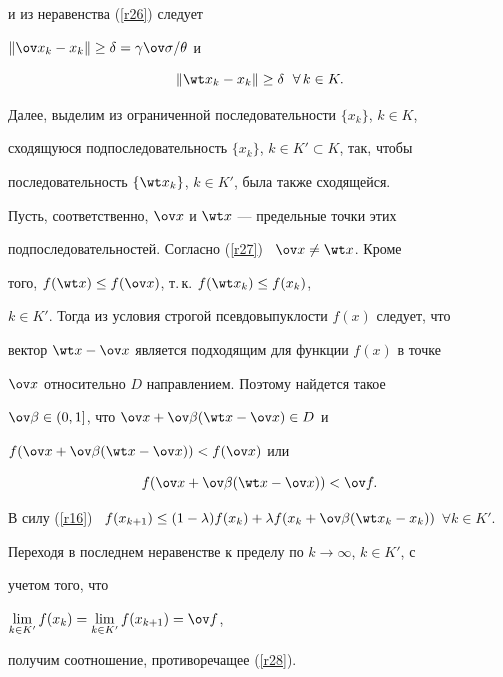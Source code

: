 \begin{pf}
и из неравенства (\ref{r26}) следует


$\|\ov x_k - x_k\| \ge \delta = \gamma \ov \sigma/\theta$ и




\begin{equation} \label{r27}


\|\wt x_k - x_k\| \ge \delta \ \; \forall \, k\in K.


\end{equation}


%


Далее, выделим из ограниченной последовательности $\{x_k\}$, $k\in K$,


сходящуюся подпоследовательность $\{x_k\}$, $k\in K'\subset K$, так, чтобы


последовательность $\{\wt x_k\}$, $k\in K'$, была также сходящейся.


Пусть, соответственно, $\ov x$ и $\wt x$ --- предельные точки этих


подпоследовательностей. Согласно (\ref{r27}) \ $\ov x\ne \wt x$. Кроме


того, $f(\wt x)\le f(\ov x)$, т.\,к. $f(\wt x_k)\le f(x_k)$,


$k\in K'$. Тогда из условия строгой псевдовыпуклости $f(x)$ следует, что


вектор $\wt x- \ov x$ является подходящим для функции $f(x)$ в точке


$\ov x$ относительно $D$ направлением. Поэтому найдется такое


$\ov \beta \in (0,1]$, что $\ov x+\ov \beta (\wt x-\ov x)\in D$ и


$f(\ov x + \ov \beta (\wt x-\ov x))< f(\ov x)$ или




\begin{equation} \label{r28}


f(\ov x + \ov \beta (\wt x-\ov x))< \ov f.


\end{equation}


%


В силу (\ref{r16}) \ $f(x_{k+1})\le (1-\lambda)f(x_k) +


\lambda f(x_k + \ov \beta (\wt x_k - x_k))$ $\forall k\in K'$.


Переходя в последнем неравенстве к пределу по $k\to \infty$, $k\in K'$, с


учетом того, что


$\lim \limits_{k\in K'} f(x_k)= \lim \limits_{k\in K'} f(x_{k+1})=\ov f$,


получим соотношение, противоречащее (\ref{r28}).


\end{pf}








